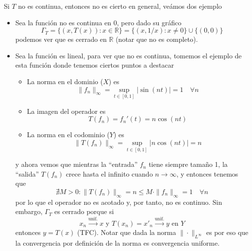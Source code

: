 \noindent 
Si $T$ no es continua, entonces no es cierto en general, veámos dos ejemplo
\begin{itemize}
    \item Sea la función 
    no es continua en 0, pero dado su gráfico
    \begin{equation*}
        \Gamma_T = \{ (x, T(x)) : x \in \mathbb{R} \} = \{ (x, 1/x) : x \neq 0 \} \cup \{ (0, 0) \}
    \end{equation*}
    podemos ver que es cerrado en $\mathbb{R}$ (notar que no es completo).
    \item Sea la función
    es lineal, para ver que no es continua, tomemos el ejemplo de esta función 
    donde tenemos ciertos puntos a destacar
    \begin{itemize}
        \item La norma en el dominio ($X$) es 
        $$\|f_n\|_\infty = \sup_{t \in [0,1]} |\sin(nt)| = 1\quad  \forall n$$
        \item La imagen del operador es 
        $$T(f_n) = f_n'(t) = n \cos(nt)$$
        \item La norma en el codominio ($Y$) es 
        $$\|T(f_n)\|_\infty = \sup_{t \in [0,1]} |n \cos(nt)| = n$$
    \end{itemize}
    y ahora vemos que mientras la ``entrada'' $f_n$ tiene siempre tamaño 1, la ``salida'' $T(f_n)$ crece hasta el infinito cuando $n \to \infty$, y entonces tenemos que 
    \begin{equation*}
        \nexists M > 0 : \|T(f_n)\|_\infty=n \leq M \cdot \|f_n\|_\infty=1 \quad \forall n
    \end{equation*}
    por lo que el operador no es acotado y, por tanto, no es continuo. Sin embargo, $\Gamma_T$ es cerrado porque si 
    \begin{equation*}
    x_n \xrightarrow{\text{unif.}} x \text{ y } T(x_n) = x'_n \xrightarrow{\text{unif.}} y \text{ en } Y
    \end{equation*}
    entonces $y = T(x)$ (TFC). Notar que dada la norma $\|\cdot\|_{L^\infty}$ es por eso que la convergencia por definición de la norma es convergencia uniforme.
\end{itemize}


